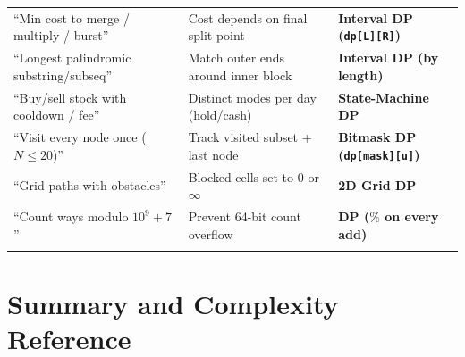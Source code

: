\documentclass[11pt,a4paper]{article}
\theoremstyle{definition}
\begin{document}
\begin{tabularx}{\textwidth}{>{\raggedright\arraybackslash}p{4.3cm} >{\raggedright\arraybackslash}X >{\raggedright\arraybackslash\bfseries}p{4.1cm}}
``Min cost to merge / multiply / burst'' & Cost depends on final split point & Interval DP (\texttt{dp[L][R]}) \\
``Longest palindromic substring/subseq'' & Match outer ends around inner block & Interval DP (by length) \\
``Buy/sell stock with cooldown / fee'' & Distinct modes per day (hold/cash) & State-Machine DP \\
``Visit every node once ($N \le 20$)'' & Track visited subset + last node & Bitmask DP (\texttt{dp[mask][u]}) \\
``Grid paths with obstacles'' & Blocked cells set to $0$ or $\infty$ & 2D Grid DP \\
``Count ways modulo $10^9 + 7$'' & Prevent 64-bit count overflow & DP ($\%$ on every add) \\
\arrayrulecolor{primaryblue}\bottomrule[1.2pt]
\end{tabularx}\endgroup

\section{Summary and Complexity Reference}
\end{document}
